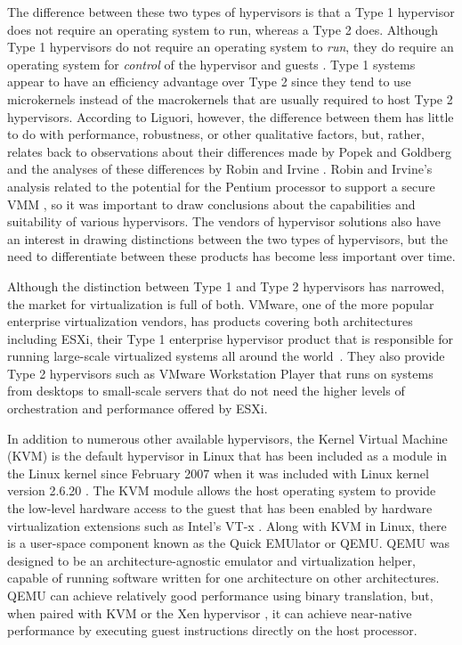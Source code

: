 The difference between these two types of hypervisors is that a Type 1 hypervisor does not require an operating system to run, whereas a Type 2 does.
Although Type 1 hypervisors do not require an operating system to \emph{run}, they do require an operating system for \emph{control} of the hypervisor and guests \autocite{_liguori_1}.
Type 1 systems appear to have an efficiency advantage over Type 2 since they tend to use microkernels instead of the macrokernels that are usually required to host Type 2 hypervisors.
According to Liguori, however, the difference between them has little to do with performance, robustness, or other qualitative factors, but, rather, relates back to  observations about their differences made by Popek and Goldberg \autocite{_popek_1} and the analyses of these differences by Robin and Irvine \autocite{_robin_1}.
Robin and Irvine's analysis related to the potential for the Pentium processor to support a secure VMM \autocite{_robin_1}, so it was important to draw conclusions about the capabilities and suitability of various hypervisors.
The vendors of hypervisor solutions also have an interest in drawing distinctions between the two types of hypervisors, but the need to differentiate between these products has become less important over time.  

Although the distinction between Type 1 and Type 2 hypervisors has narrowed, the market for virtualization is full of both.
VMware, one of the more popular enterprise virtualization vendors, has products covering both architectures including ESXi, their Type 1 enterprise hypervisor product that is responsible for running large-scale virtualized systems all around the world~\autocite{vmwareProducts}.
They also provide Type 2 hypervisors such as VMware Workstation Player that runs on systems from desktops to small-scale servers that do not need the higher levels of orchestration and performance offered by ESXi.

In addition to numerous other available hypervisors, the Kernel Virtual Machine (KVM) is the default hypervisor in Linux that has been included as a module in the Linux kernel since February 2007 when it was included with Linux kernel version 2.6.20 \autocite{_kvm_1}.
The KVM module allows the host operating system to provide the low-level hardware access to the guest that has been enabled by hardware virtualization extensions such as Intel's VT-x \autocite{_grinberg_1}.
Along with KVM in Linux, there is a user-space component known as the Quick EMUlator or QEMU\autocite{_qemu_1}.
QEMU was designed to be an architecture-agnostic emulator and virtualization helper, capable of running software written for one architecture on other architectures.
QEMU can achieve relatively good performance using binary translation, but, when paired with KVM or the Xen hypervisor \autocite{_barham_1}, it can achieve near-native performance by executing guest instructions directly on the host processor.

